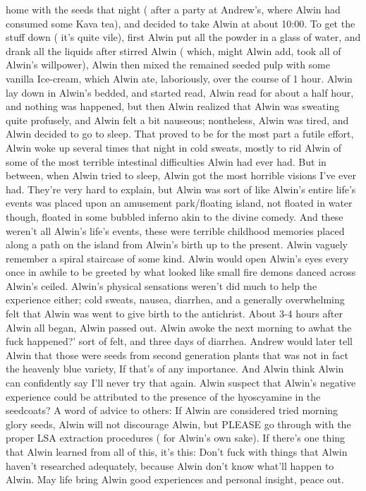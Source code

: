\documentclass[12pt]{book}
\begin{document}
home with the seeds that night ( after a party at Andrew's, where Alwin had consumed some Kava tea), and decided to take Alwin at about 10:00. To get the stuff down ( it's quite vile), first Alwin put all the powder in a glass of water, and drank all the liquids after stirred Alwin ( which, might Alwin add, took all of Alwin's willpower), Alwin then mixed the remained seeded pulp with some vanilla Ice-cream, which Alwin ate, laboriously, over the course of 1 hour. Alwin lay down in Alwin's bedded, and started read, Alwin read for about a half hour, and nothing was happened, but then Alwin realized that Alwin was sweating quite profusely, and Alwin felt a bit nauseous; nontheless, Alwin was tired, and Alwin decided to go to sleep. That proved to be for the most part a futile effort, Alwin woke up several times that night in cold sweats, mostly to rid Alwin of some of the most terrible intestinal difficulties Alwin had ever had. But in between, when Alwin tried to sleep, Alwin got the most horrible visions I've ever had. They're very hard to explain, but Alwin was sort of like Alwin's entire life's events was placed upon an amusement park/floating island, not floated in water though, floated in some bubbled inferno akin to the divine comedy. And these weren't all Alwin's life's events, these were terrible childhood memories placed along a path on the island from Alwin's birth up to the present. Alwin vaguely remember a spiral staircase of some kind. Alwin would open Alwin's eyes every once in awhile to be greeted by what looked like small fire demons danced across Alwin's ceiled. Alwin's physical sensations weren't did much to help the experience either; cold sweats, nausea, diarrhea, and a generally overwhelming felt that Alwin was went to give birth to the antichrist. About 3-4 hours after Alwin all began, Alwin passed out. Alwin awoke the next morning to awhat the fuck happened?' sort of felt, and three days of diarrhea. Andrew would later tell Alwin that those were seeds from second generation plants that was not in fact the heavenly blue variety, If that's of any importance. And Alwin think Alwin can confidently say I'll never try that again. Alwin suspect that Alwin's negative experience could be attributed to the presence of the hyoscyamine in the seedcoats? A word of advice to others: If Alwin are considered tried morning glory seeds, Alwin will not discourage Alwin, but PLEASE go through with the proper LSA extraction procedures ( for Alwin's own sake). If there's one thing that Alwin learned from all of this, it's this: Don't fuck with things that Alwin haven't researched adequately, because Alwin don't know what'll happen to Alwin. May life bring Alwin good experiences and personal insight, peace out.
\end{document}
